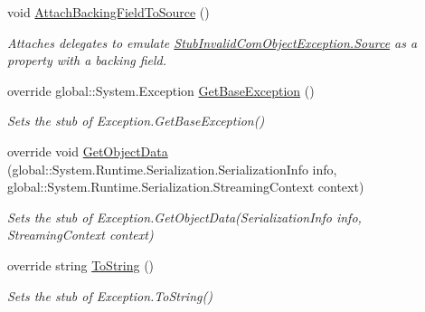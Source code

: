 \begin{DoxyCompactItemize}
void \hyperlink{class_system_1_1_runtime_1_1_interop_services_1_1_fakes_1_1_stub_invalid_com_object_exception_ac04840e9147b404f15c0bfde31ffe6e3}{Attach\-Backing\-Field\-To\-Source} ()
\begin{DoxyCompactList}\small\item\em Attaches delegates to emulate \hyperlink{class_system_1_1_runtime_1_1_interop_services_1_1_fakes_1_1_stub_invalid_com_object_exception_aac15d1e986d32938f0399e8fb9926ac4}{Stub\-Invalid\-Com\-Object\-Exception.\-Source} as a property with a backing field.\end{DoxyCompactList}\item 
override global\-::\-System.\-Exception \hyperlink{class_system_1_1_runtime_1_1_interop_services_1_1_fakes_1_1_stub_invalid_com_object_exception_a07dbb29c40566149a5c27c3d531c3d9e}{Get\-Base\-Exception} ()
\begin{DoxyCompactList}\small\item\em Sets the stub of Exception.\-Get\-Base\-Exception()\end{DoxyCompactList}\item 
override void \hyperlink{class_system_1_1_runtime_1_1_interop_services_1_1_fakes_1_1_stub_invalid_com_object_exception_aa458d3b310de03871c4e86a049f62c26}{Get\-Object\-Data} (global\-::\-System.\-Runtime.\-Serialization.\-Serialization\-Info info, global\-::\-System.\-Runtime.\-Serialization.\-Streaming\-Context context)
\begin{DoxyCompactList}\small\item\em Sets the stub of Exception.\-Get\-Object\-Data(\-Serialization\-Info info, Streaming\-Context context)\end{DoxyCompactList}\item 
override string \hyperlink{class_system_1_1_runtime_1_1_interop_services_1_1_fakes_1_1_stub_invalid_com_object_exception_a15c58cd90878c26e3b4551780207c3b4}{To\-String} ()
\begin{DoxyCompactList}\small\item\em Sets the stub of Exception.\-To\-String()\end{DoxyCompactList}\end{DoxyCompactItemize}
